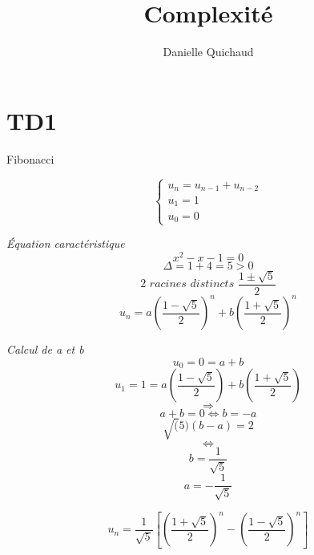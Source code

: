 \providecommand{\VarRectoVerso}{\oneside}

\title{Complexité}
\author{Danielle Quichaud}
\usepackage{amsmath}
\usepackage{graphicx}

\maketitle
\tableofcontents
\section{TD1}

\begin{exercice}{Fibonacci}

\[ \begin{cases} u_n = u_{n-1} + u_{n-2} \\ u_1 = 1 \\ u_0= 0 \end{cases} \]

\textit{Équation caractéristique} 
\[x^2-x-1 = 0\]
\[ \Delta = 1+4=5 >0 \]
\[ \textit{2 racines distincts } \frac{1 \pm \sqrt{5}}{2} \]
\[ u_n = a \left(\frac{1 - \sqrt{5}}{2}\right)^n + b \left(\frac{1 + \sqrt{5}}{2}\right)^n \]

\textit{Calcul de a et b} 
\[ u_0 = 0 = a +b \]
\[ u_1 = 1 = a \left(\frac{1 - \sqrt{5}}{2}\right) + b \left(\frac{1 + \sqrt{5}}{2}\right) \]
\[ \Rightarrow \]
\[ a + b = 0 \Leftrightarrow b = -a \]
\[ \sqrt(5) (b-a) = 2 \]
\[ \Leftrightarrow \]
\[ b = \frac{1}{\sqrt{5}} \]
\[ a = -\frac{1}{\sqrt{5}} \]

\[ u_n = \frac{1}{\sqrt{5}} \left[ \left( \frac{1 + \sqrt{5}}{2} \right)^n - \left( \frac{1 - \sqrt{5}}{2} \right)^n \right] \]


\end{exercice}


